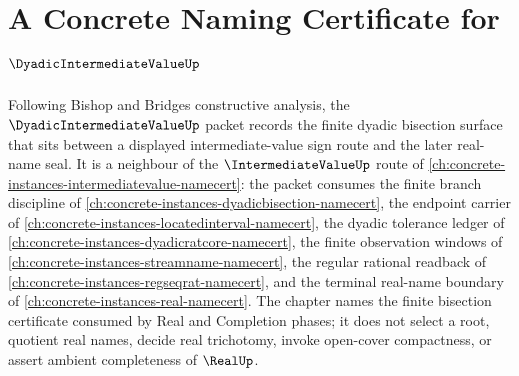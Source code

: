 \chapter{A Concrete Naming Certificate for $\DyadicIntermediateValueUp$}
\label{ch:concrete-instances-dyadic-intermediate-value-namecert}

Following Bishop and Bridges constructive analysis, the $\DyadicIntermediateValueUp$ packet records the finite dyadic bisection surface that sits between a displayed intermediate-value sign route and the later real-name seal. It is a neighbour of the $\IntermediateValueUp$ route of \autoref{ch:concrete-instances-intermediatevalue-namecert}: the packet consumes the finite branch discipline of \autoref{ch:concrete-instances-dyadicbisection-namecert}, the endpoint carrier of \autoref{ch:concrete-instances-locatedinterval-namecert}, the dyadic tolerance ledger of \autoref{ch:concrete-instances-dyadicratcore-namecert}, the finite observation windows of \autoref{ch:concrete-instances-streamname-namecert}, the regular rational readback of \autoref{ch:concrete-instances-regseqrat-namecert}, and the terminal real-name boundary of \autoref{ch:concrete-instances-real-namecert}. The chapter names the finite bisection certificate consumed by Real and Completion phases; it does not select a root, quotient real names, decide real trichotomy, invoke open-cover compactness, or assert ambient completeness of $\RealUp$.

